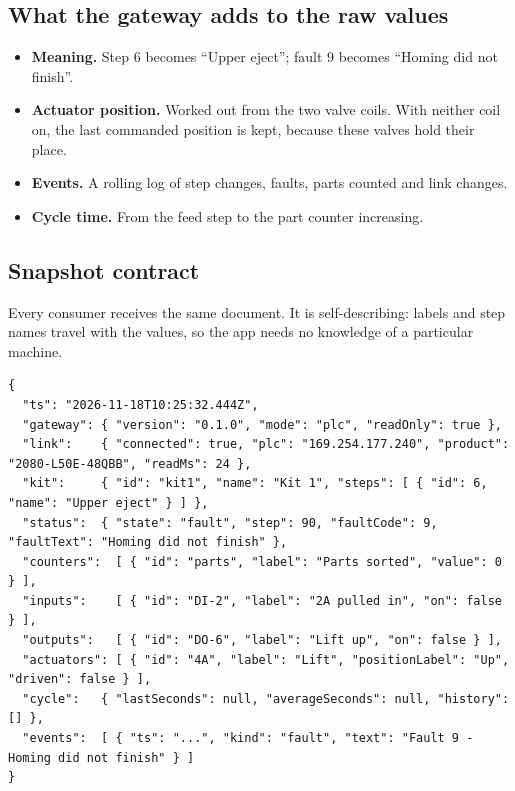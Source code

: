 \documentclass[a4paper,10.5pt]{article}
\begin{document}
\subsection{What the gateway adds to the raw values}
\begin{itemize}
  \item \textbf{Meaning.} Step 6 becomes ``Upper eject''; fault 9 becomes ``Homing did not finish''.
  \item \textbf{Actuator position.} Worked out from the two valve coils. With neither coil on, the last commanded position is kept, because these valves hold their place.
  \item \textbf{Events.} A rolling log of step changes, faults, parts counted and link changes.
  \item \textbf{Cycle time.} From the feed step to the part counter increasing.
\end{itemize}

\subsection{Snapshot contract}
Every consumer receives the same document. It is self-describing: labels and step names travel with the
values, so the app needs no knowledge of a particular machine.
\begin{lstlisting}
{
  "ts": "2026-11-18T10:25:32.444Z",
  "gateway": { "version": "0.1.0", "mode": "plc", "readOnly": true },
  "link":    { "connected": true, "plc": "169.254.177.240", "product": "2080-L50E-48QBB", "readMs": 24 },
  "kit":     { "id": "kit1", "name": "Kit 1", "steps": [ { "id": 6, "name": "Upper eject" } ] },
  "status":  { "state": "fault", "step": 90, "faultCode": 9, "faultText": "Homing did not finish" },
  "counters":  [ { "id": "parts", "label": "Parts sorted", "value": 0 } ],
  "inputs":    [ { "id": "DI-2", "label": "2A pulled in", "on": false } ],
  "outputs":   [ { "id": "DO-6", "label": "Lift up", "on": false } ],
  "actuators": [ { "id": "4A", "label": "Lift", "positionLabel": "Up", "driven": false } ],
  "cycle":   { "lastSeconds": null, "averageSeconds": null, "history": [] },
  "events":  [ { "ts": "...", "kind": "fault", "text": "Fault 9 - Homing did not finish" } ]
}
\end{lstlisting}
\end{document}
